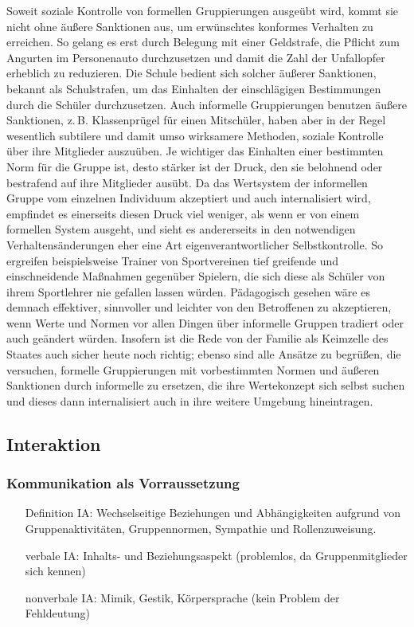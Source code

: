 \documentclass[12pt]{scrartcl}
\DeclareRobustCommand{\zB}{z.\,B.\xspace}
\begin{document}
Soweit soziale Kontrolle von formellen Gruppierungen ausgeübt wird, kommt sie
nicht ohne äußere Sanktionen aus, um erwünschtes konformes Verhalten zu
erreichen. So gelang es erst durch Belegung mit einer Geldstrafe, die Pflicht
zum Angurten im Personenauto durchzusetzen und damit die Zahl der Unfallopfer
erheblich zu reduzieren. Die Schule bedient sich solcher äußerer Sanktionen,
bekannt als Schulstrafen, um das Einhalten der einschlägigen Bestimmungen durch
die Schüler durchzusetzen. Auch informelle Gruppierungen benutzen äußere
Sanktionen, \zB Klassenprügel für einen Mitschüler, haben aber in der Regel
wesentlich subtilere und damit umso wirksamere Methoden, soziale Kontrolle über
ihre Mitglieder auszuüben. Je wichtiger das Einhalten einer bestimmten Norm für
die Gruppe ist, desto stärker ist der Druck, den sie belohnend oder bestrafend
auf ihre Mitglieder ausübt. Da das Wertsystem der informellen Gruppe vom
einzelnen Individuum akzeptiert und auch internalisiert wird, empfindet es
einerseits diesen Druck viel weniger, als wenn er von einem formellen System
ausgeht, und sieht es andererseits in den notwendigen Verhaltensänderungen eher
eine Art eigenverantwortlicher Selbstkontrolle. So ergreifen beispielsweise
Trainer von Sportvereinen tief greifende und einschneidende Maßnahmen gegenüber
Spielern, die sich diese als Schüler von ihrem Sportlehrer nie gefallen lassen
würden. Pädagogisch gesehen wäre es demnach effektiver, sinnvoller und leichter
von den Betroffenen zu akzeptieren, wenn Werte und Normen vor allen Dingen über
informelle Gruppen tradiert oder auch geändert würden. Insofern ist die Rede
von der Familie als Keimzelle des Staates auch sicher heute noch richtig;
ebenso sind alle Ansätze zu begrüßen, die versuchen, formelle Gruppierungen mit
vorbestimmten Normen und äußeren Sanktionen durch informelle zu ersetzen, die
ihre Wertekonzept sich selbst suchen und dieses dann internalisiert auch in
ihre weitere Umgebung hineintragen.

\subsection{Interaktion}

\subsubsection{Kommunikation als Vorraussetzung}
\begin{itemize}
	\item[Definition IA:] Wechselseitige Beziehungen und Abhängigkeiten
		aufgrund von Gruppenaktivitäten, Gruppennormen, Sympathie und
		Rollenzuweisung.
	\item[verbale IA:] Inhalts- und Beziehungsaspekt (problemlos, da
		Gruppenmitglieder sich kennen)
	\item[nonverbale IA:] Mimik, Gestik, Körpersprache (kein Problem der
		Fehldeutung)
\end{itemize}
\end{document}
